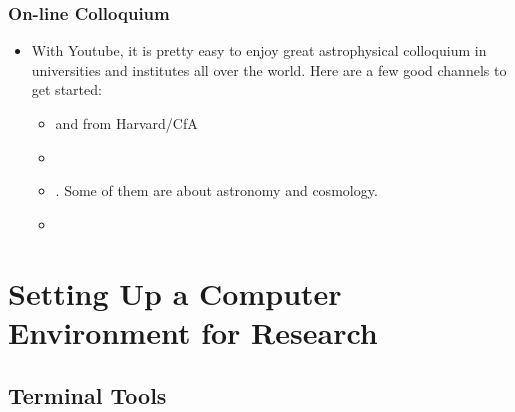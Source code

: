 \documentclass[letterpaper,10pt,english]{sphinxmanual}
\begin{document}
\subsubsection{On-line Colloquium}
\label{\detokenize{resource/research/getting_started:on-line-colloquium}}\begin{itemize}
\item {} 
With Youtube, it is pretty easy to enjoy great astrophysical
colloquium in universities and institutes all over the world. Here
are a few good channels to get started:
\begin{itemize}
\item {} 
and 
from Harvard/CfA

\item {} 

\item {} 
.
Some of them are about astronomy and cosmology.

\item {} 

\end{itemize}

\end{itemize}


\section{Setting Up a Computer Environment for Research}
\label{\detokenize{resource/research/computer_basics:setting-up-a-computer-environment-for-research}}\label{\detokenize{resource/research/computer_basics::doc}}

\subsection{Terminal Tools}
\label{\detokenize{resource/research/computer_basics:terminal-tools}}
\end{document}
